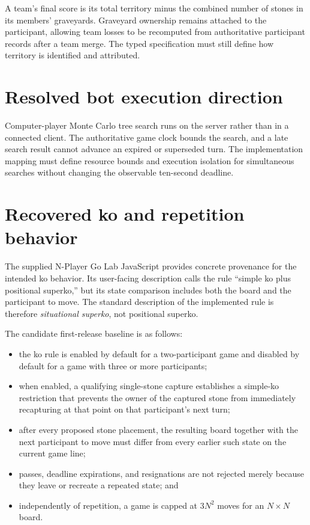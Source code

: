 \documentclass[11pt,oneside]{book}
\begin{document}
A team's final score is its total territory minus the combined number of stones in its members' graveyards. Graveyard ownership remains attached to the participant, allowing team losses to be recomputed from authoritative participant records after a team merge. The typed specification must still define how territory is identified and attributed.

\section{Resolved bot execution direction}
Computer-player Monte Carlo tree search runs on the server rather than in a connected client. The authoritative game clock bounds the search, and a late search result cannot advance an expired or superseded turn. The implementation mapping must define resource bounds and execution isolation for simultaneous searches without changing the observable ten-second deadline.

\section{Recovered ko and repetition behavior}
The supplied N-Player Go Lab JavaScript provides concrete provenance for the intended ko behavior. Its user-facing description calls the rule ``simple ko plus positional superko,'' but its state comparison includes both the board and the participant to move. The standard description of the implemented rule is therefore \emph{situational superko}, not positional superko.

The candidate first-release baseline is as follows:
\begin{itemize}
  \item the ko rule is enabled by default for a two-participant game and disabled by default for a game with three or more participants;
  \item when enabled, a qualifying single-stone capture establishes a simple-ko restriction that prevents the owner of the captured stone from immediately recapturing at that point on that participant's next turn;
  \item after every proposed stone placement, the resulting board together with the next participant to move must differ from every earlier such state on the current game line;
  \item passes, deadline expirations, and resignations are not rejected merely because they leave or recreate a repeated state; and
  \item independently of repetition, a game is capped at \(3N^2\) moves for an \(N\times N\) board.
\end{itemize}
\end{document}
